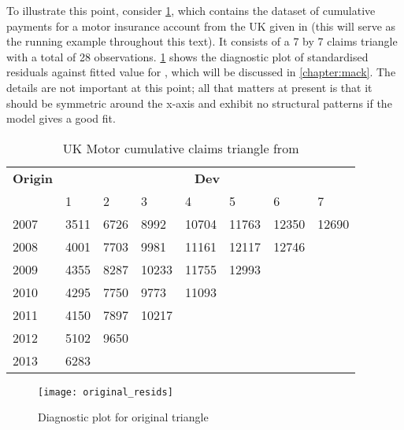 \documentclass[a4paper]{book}
\begin{document}
To illustrate this point, consider \cref{tab:uk-motor}, which contains the dataset of cumulative payments for a motor insurance account from the UK given in \cite{christofides} (this will serve as the running example throughout this text). It consists of a 7 by 7 claims triangle with a total of 28 observations. \cref{fig:diag-plot-original} shows the diagnostic plot of standardised residuals against fitted value for , which will be discussed in \cref{chapter:mack}. The details are not important at this point; all that matters at present is that it should be symmetric around the x-axis and exhibit no structural patterns if the model gives a good fit.

\begin{table}[!htb]
  \centering
  \begin{tabularx}{0.7\linewidth}{XXXXXXXX} \toprule
    \bf{Origin} & \multicolumn{7}{c}{\bf{Dev}}                                                \\ \cmidrule{2-8}
                & 1                            & 2    & 3     & 4     & 5     & 6     & 7     \\ \midrule
    2007        & 3511                         & 6726 & 8992  & 10704 & 11763 & 12350 & 12690 \\
    2008        & 4001                         & 7703 & 9981  & 11161 & 12117 & 12746 &       \\
    2009        & 4355                         & 8287 & 10233 & 11755 & 12993 &       &       \\
    2010        & 4295                         & 7750 & 9773  & 11093 &       &       &       \\
    2011        & 4150                         & 7897 & 10217 &       &       &       &       \\
    2012        & 5102                         & 9650 &       &       &       &       &       \\
    2013        & 6283                         &      &       &       &       &       &       \\
    \bottomrule
  \end{tabularx}
  \caption{UK Motor cumulative claims triangle from \textcite{christofides}}
  \label{tab:uk-motor}
\end{table}

\begin{figure}[!htb]
  \centering
  \texttt{[image: original\_resids]}
  \caption{Diagnostic plot for original triangle}
  \label{fig:diag-plot-original}
\end{figure}
\end{document}
